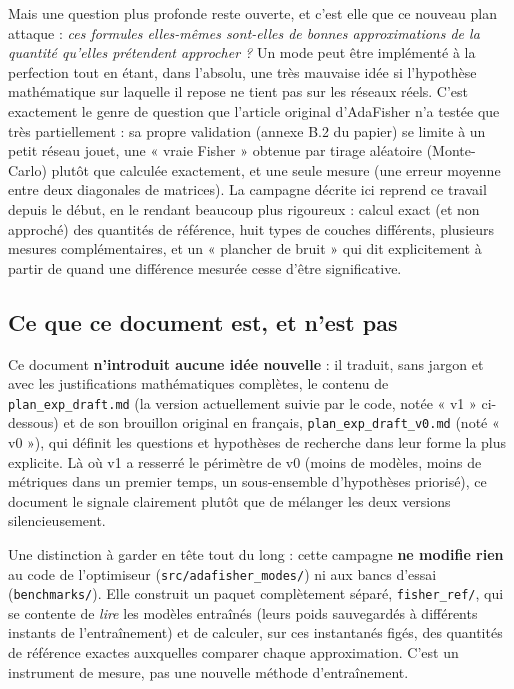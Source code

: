 \documentclass[11pt,a4paper]{article}
\begin{document}
Mais une question plus profonde reste ouverte, et c'est elle que ce nouveau plan attaque : \emph{ces
formules elles-mêmes sont-elles de bonnes approximations de la quantité qu'elles prétendent
approcher ?} Un mode peut être implémenté à la perfection tout en étant, dans l'absolu, une très
mauvaise idée si l'hypothèse mathématique sur laquelle il repose ne tient pas sur les réseaux réels.
C'est exactement le genre de question que l'article original d'AdaFisher n'a testée que très
partiellement : sa propre validation (annexe B.2 du papier) se limite à un petit réseau jouet, une
« vraie Fisher » obtenue par tirage aléatoire (Monte-Carlo) plutôt que calculée exactement, et une
seule mesure (une erreur moyenne entre deux diagonales de matrices). La campagne décrite ici reprend
ce travail depuis le début, en le rendant beaucoup plus rigoureux : calcul exact (et non approché)
des quantités de référence, huit types de couches différents, plusieurs mesures complémentaires, et
un « plancher de bruit » qui dit explicitement à partir de quand une différence mesurée cesse d'être
significative.

\subsection{Ce que ce document est, et n'est pas}

Ce document \textbf{n'introduit aucune idée nouvelle} : il traduit, sans jargon et avec les
justifications mathématiques complètes, le contenu de \texttt{plan\_exp\_draft.md} (la version
actuellement suivie par le code, notée « v1 » ci-dessous) et de son brouillon original en français,
\texttt{plan\_exp\_draft\_v0.md} (noté « v0 »), qui définit les questions et hypothèses de recherche
dans leur forme la plus explicite. Là où v1 a resserré le périmètre de v0 (moins de modèles, moins de
métriques dans un premier temps, un sous-ensemble d'hypothèses priorisé), ce document le signale
clairement plutôt que de mélanger les deux versions silencieusement.

Une distinction à garder en tête tout du long : cette campagne \textbf{ne modifie rien} au code de
l'optimiseur (\texttt{src/adafisher\_modes/}) ni aux bancs d'essai (\texttt{benchmarks/}). Elle
construit un paquet complètement séparé, \texttt{fisher\_ref/}, qui se contente de \emph{lire} les
modèles entraînés (leurs poids sauvegardés à différents instants de l'entraînement) et de calculer,
sur ces instantanés figés, des quantités de référence exactes auxquelles comparer chaque
approximation. C'est un instrument de mesure, pas une nouvelle méthode d'entraînement.
\end{document}
